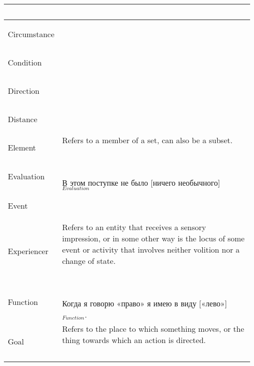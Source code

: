 \documentclass[a4paper,11pt, onecolumn,twoside]{article}
\begin{document}
\begin{longtable}{ p{}  p{} }
        & ~ \\
\midrule
 \multirow{2}{*}{Circumstance} & ~ \\ 
        & ~ \\
\midrule
 \multirow{2}{*}{Condition} & ~ \\ 
        & ~ \\
\midrule
 \multirow{2}{*}{Direction} & ~ \\ 
        & ~ \\
\midrule
 \multirow{2}{*}{Distance} & ~ \\ 
        & ~ \\
\midrule
 \multirow{2}{*}{Element} &  Refers to a member of a set, can also be a subset. \\
        & ~ \\
\midrule
 \multirow{2}{*}{Evaluation} & ~ \\  
        & В этом поступке не было [ничего необычного]$_{Evaluation}$ \\
\midrule
 \multirow{2}{*}{Event} & ~ \\ 
        & ~ \\
\midrule
 \multirow{2}{*}{Experiencer} & Refers to an entity that receives a sensory impression, or in some other way is the locus of some event or activity that involves neither volition nor a change of state. \\ 
        & ~ \\
\midrule
 \multirow{2}{*}{Function} & ~ \\ 
        & Когда я говорю «право» я имею в виду [«лево»]$_{Function}$. \\
\midrule
 \multirow{2}{*}{Goal} & Refers to the place to which something moves, or the thing towards which an action is directed. \\ 
\midrule
 \multirow{2}{*}{Goer} & ~ \\ 

\end{longtable}
\end{document}
